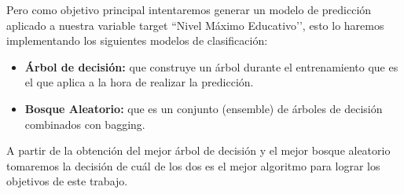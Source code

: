 \documentclass[a4paper]{article}
\begin{document}
        Pero como objetivo principal intentaremos generar un modelo de predicción aplicado a nuestra variable target ``Nivel Máximo Educativo’’, esto lo haremos implementando los siguientes modelos de clasificación:
        \begin{itemize}
            \item \textbf{Árbol de decisión:} que construye un árbol durante el entrenamiento que es el que aplica a la hora de realizar la predicción.
            \item \textbf{Bosque Aleatorio:} que es un conjunto (ensemble) de árboles de decisión combinados con bagging.
        \end{itemize}
        A partir de la obtención del mejor árbol de decisión y el mejor bosque aleatorio tomaremos la decisión de cuál de los dos es el mejor algoritmo para lograr los objetivos de este trabajo.



        

    
\end{document}
